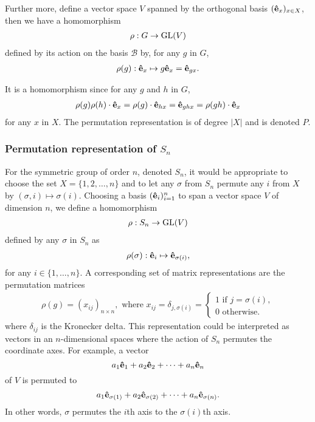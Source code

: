 	Further more, define a vector space $V$ spanned by the orthogonal basis $(\mathbf{\hat{e}}_x)_{x \in X}$, then we have a homomorphism
	\begin{align}
		\rho: G \rightarrow \text{GL}(V)
	\end{align}
	defined by its action on the basis $\mathcal{B}$ by, for any $g$ in $G$,
	\begin{align}
		\rho(g): \mathbf{\hat{e}}_x \mapsto g\mathbf{\hat{e}}_x = \mathbf{\hat{e}}_{gx}.
	\end{align}
	
	It is a homomorphism since for any $g$ and $h$ in $G$,
	\begin{align}
		\rho(g) \rho(h) \cdot \mathbf{\hat{e}}_x = \rho(g) \cdot \mathbf{\hat{e}}_{hx} = \mathbf{\hat{e}}_{ghx} = \rho(gh) \cdot \mathbf{\hat{e}}_x
	\end{align}
	for any $x$ in $X$. The permutation representation is of degree $|X|$ and is denoted $P$.
	
	
	\subsubsection{Permutation representation of $S_n$}
	For the symmetric group of order $n$, denoted $S_n$, it would be appropriate to choose the set $X = \{1,2, \dots, n\}$ and to let any $\sigma$ from $S_n$ permute any $i$ from $X$ by $(\sigma,i) \mapsto \sigma(i)$. Choosing a basis $(\mathbf{\hat{e}}_i)_{i=1}^n$ to span a vector space $V$ of dimension $n$, we define a homomorphism 
	\begin{align}
		\rho: S_n \rightarrow \text{GL}(V)
	\end{align}
	defined by any $\sigma$ in $S_n$ as
	\begin{align}
		\rho(\sigma): \mathbf{\hat{e}}_i \mapsto \mathbf{\hat{e}}_{\sigma(i)},
	\end{align}
	for any $i \in \{1,\dots, n\}$. A corresponding set of matrix representations are the permutation matrices
	\begin{align}
		\rho(g) = (x_{ij})_{n \times n}, \text{ where } x_{ij} = \delta_{j,\sigma(i)} = \begin{cases}
			1 \text{ if } j = \sigma(i),\\
			0 \text{ otherwise.}
		\end{cases}
	\end{align}
	where $\delta_{ij}$ is the Kronecker delta.	This representation could be interpreted as vectors in an $n$-dimensional spaces where the action of $S_n$ permutes the coordinate axes. For example, a vector 
	\[
		a_1 \mathbf{\hat{e}}_1 + a_2 \mathbf{\hat{e}}_2 + \dots + a_n \mathbf{\hat{e}}_n
	\]
	of $V$ is permuted to 
	\[
		a_1 \mathbf{\hat{e}}_{\sigma(1)} + a_2 \mathbf{\hat{e}}_{\sigma(2)} + \dots + a_n \mathbf{\hat{e}}_{\sigma(n)}.
	\]
	In other words, $\sigma$ permutes the $i$th axis to the $\sigma(i)$th axis.
	
